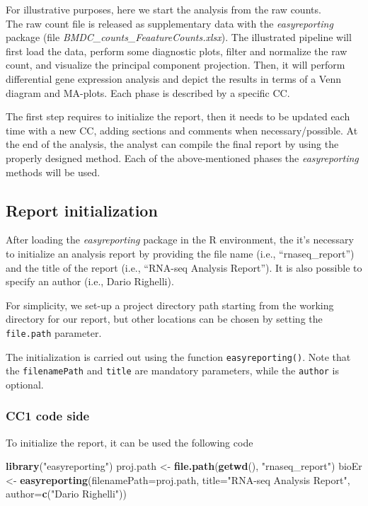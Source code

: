 \documentclass[]{article}
\newenvironment{Shaded}{\begin{snugshade}}{\end{snugshade}}
\newcommand{\DataTypeTok}[1]{\textcolor[rgb]{0.13,0.29,0.53}{#1}}
\newcommand{\KeywordTok}[1]{\textcolor[rgb]{0.13,0.29,0.53}{\textbf{#1}}}
\newcommand{\NormalTok}[1]{#1}
\newcommand{\StringTok}[1]{\textcolor[rgb]{0.31,0.60,0.02}{#1}}
\begin{document}
For illustrative purposes, here we start the analysis from the raw
counts.\\
The raw count file is released as supplementary data with the
\emph{easyreporting} package (file
\emph{BMDC\_counts\_FeaatureCounts.xlsx}). The illustrated pipeline will
first load the data, perform some diagnostic plots, filter and normalize
the raw count, and visualize the principal component projection. Then,
it will perform differential gene expression analysis and depict the
results in terms of a Venn diagram and MA-plots. Each phase is described
by a specific CC.

The first step requires to initialize the report, then it needs to be
updated each time with a new CC, adding sections and comments when
necessary/possible. At the end of the analysis, the analyst can compile
the final report by using the properly designed method. Each of the
above-mentioned phases the \emph{easyreporting} methods will be used.

\hypertarget{report-initialization}{%
\subsection{Report initialization}\label{report-initialization}}

After loading the \emph{easyreporting} package in the R environment, the
it's necessary to initialize an analysis report by providing the file
name (i.e., ``rnaseq\_report'') and the title of the report (i.e.,
``RNA-seq Analysis Report''). It is also possible to specify an author
(i.e., Dario Righelli).

For simplicity, we set-up a project directory path starting from the
working directory for our report, but other locations can be chosen by
setting the \texttt{file.path} parameter.

The initialization is carried out using the function
\texttt{easyreporting()}. Note that the \texttt{filenamePath} and
\texttt{title} are mandatory parameters, while the \texttt{author} is
optional.

\hypertarget{cc1-code-side}{%
\subsubsection{CC1 code side}\label{cc1-code-side}}

To initialize the report, it can be used the following code

\begin{Shaded}
\begin{Highlighting}[]
\KeywordTok{library}\NormalTok{(}\StringTok{"easyreporting"}\NormalTok{)}
\NormalTok{proj.path <-}\StringTok{ }\KeywordTok{file.path}\NormalTok{(}\KeywordTok{getwd}\NormalTok{(), }\StringTok{"rnaseq_report"}\NormalTok{)}
\NormalTok{bioEr <-}\StringTok{ }\KeywordTok{easyreporting}\NormalTok{(}\DataTypeTok{filenamePath=}\NormalTok{proj.path, }\DataTypeTok{title=}\StringTok{"RNA-seq Analysis Report"}\NormalTok{,}
                       \DataTypeTok{author=}\KeywordTok{c}\NormalTok{(}\StringTok{"Dario Righelli"}\NormalTok{))}
\end{Highlighting}
\end{Shaded}
\end{document}
